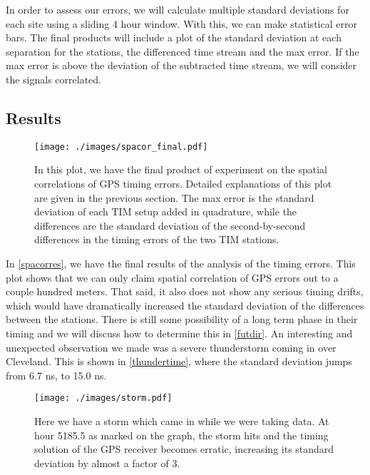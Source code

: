 In order to assess our errors, we will calculate multiple standard deviations for each site using a sliding 4 hour window. With this, we can make statistical error bars. The final products will include a plot of the standard deviation at each separation for the stations, the differenced time stream and the max error. If the max error is above the deviation of the subtracted time stream, we will consider the signals correlated. %
\subsection{Results}
\begin{figure}[h!]
\centering
\texttt{[image: ./images/spacor\_final.pdf]}
\caption[Spatial Correlation Results]{In this plot, we have the final product of experiment on the spatial correlations of GPS timing errors. Detailed explanations of this plot are given in the previous section. The max error is the standard deviation of each TIM setup added in quadrature, while the differences are the standard deviation of the second-by-second differences in the timing errors of the two TIM stations.}
\label{spacorres}
\end{figure}
In \autoref{spacorres}, we have the final results of the analysis of the timing errors. This plot shows that we can only claim spatial correlation of GPS errors out to a couple hundred meters. That said, it also does not show any serious timing drifts, which would have dramatically increased the standard deviation of the differences between the stations. There is still some possibility of a long term phase in their timing and we will discuss how to determine this in \autoref{futdir}. An interesting and unexpected observation we made was a severe thunderstorm coming in over Cleveland. This is shown in \autoref{thundertime}, where the standard deviation jumps from 6.7 ns, to 15.0 ns.
\begin{figure}[H]
\centering
\texttt{[image: ./images/storm.pdf]}
\caption[Effects of a Thunderstorm on GPS Timing]{Here we have a storm which came in while we were taking data. At hour 5185.5 as marked on the graph, the storm hits and the timing solution of the GPS receiver becomes erratic, increasing its standard deviation by almost a factor of 3.}
\label{thundertime}
\end{figure}
